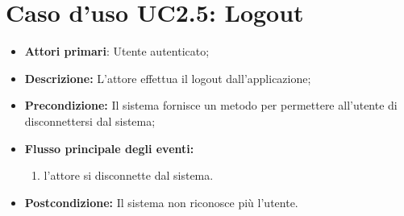 		\section{Caso d'uso UC2.5: Logout }
		\begin{itemize}
			\item \textbf{Attori primari}: Utente autenticato;
			\item \textbf{Descrizione:} L'attore effettua il logout dall'applicazione;
			\item \textbf{Precondizione:} Il sistema fornisce un metodo per permettere all'utente di disconnettersi dal sistema;
			\item \textbf{Flusso principale degli eventi:}
			\begin{enumerate}
				\item l'attore si disconnette dal sistema.
			\end{enumerate}
			\item \textbf{Postcondizione:} Il sistema non riconosce più l'utente.
		\end{itemize}
			